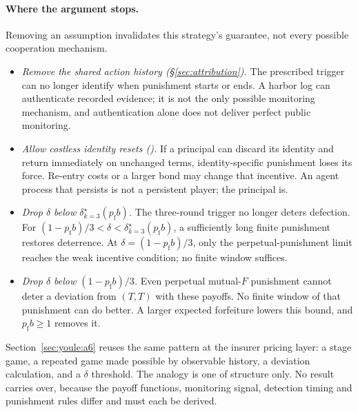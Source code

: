 \documentclass[11pt,a4paper]{article}
\theoremstyle{definition}
\theoremstyle{remark}
\begin{document}
\paragraph{Where the argument stops.}
Removing an assumption invalidates this strategy's guarantee, not every possible cooperation mechanism.
\begin{itemize}[nosep]
  \item \emph{Remove the shared action history (\S\ref{sec:attribution}).} The prescribed trigger can no longer identify when punishment starts or ends. A harbor log can authenticate recorded evidence; it is not the only possible monitoring mechanism, and authentication alone does not deliver perfect public monitoring.
  \item \emph{Allow costless identity resets ().} If a principal can discard its identity and return immediately on unchanged terms, identity-specific punishment loses its force. Re-entry costs or a larger bond may change that incentive. An agent process that persists is not a persistent player; the principal is.
  \item \emph{Drop $\delta$ below $\delta^\star_{k=3}(p_{\mathrm f}b)$.} The three-round trigger no longer deters defection. For $(1-p_{\mathrm f}b)/3<\delta<\delta^\star_{k=3}(p_{\mathrm f}b)$, a sufficiently long finite punishment restores deterrence. At $\delta=(1-p_{\mathrm f}b)/3$, only the perpetual-punishment limit reaches the weak incentive condition; no finite window suffices.
  \item \emph{Drop $\delta$ below $(1-p_{\mathrm f}b)/3$.} Even perpetual mutual-$F$ punishment cannot deter a deviation from $(T,T)$ with these payoffs. No finite window of that punishment can do better. A larger expected forfeiture lowers this bound, and $p_{\mathrm f}b\ge1$ removes it.
\end{itemize}

Section~\ref{sec:youle:a6} reuses the same pattern at the insurer pricing layer: a stage game, a repeated game made possible by observable history, a deviation calculation, and a $\delta$ threshold. The analogy is one of structure only. No result carries over, because the payoff functions, monitoring signal, detection timing and punishment rules differ and must each be derived.
\end{document}
